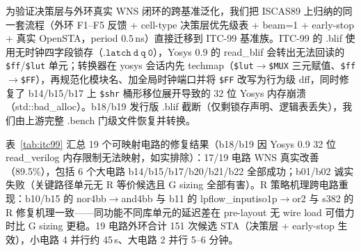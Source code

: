 \documentclass[journal]{IEEEtran}
\begin{document}
为验证决策层与外环真实 WNS 闭环的跨基准泛化，我们把 ISCAS89 上归纳的同一套流程（外环 F1--F5 反馈 + cell-type 决策层优先级表 + beam=1 + early-stop + 真实 OpenSTA，period $0.5\,$ns）直接迁移到 ITC-99 基准族。ITC-99 的 .blif 使用无时钟四字段锁存（$\mathtt{.latch\ d\ q\ 0}$），Yosys 0.9 的 read\_blif 会转出无法回读的 \texttt{\$ff}/\texttt{\$lut} 单元；转换器在 yosys 会话内先 techmap（\texttt{\$lut}$\rightarrow$\texttt{\$\textunderscore MUX\textunderscore} 三元赋值、\texttt{\$ff}$\rightarrow$\texttt{\$\textunderscore FF\textunderscore}），再规范化模块名、加全局时钟端口并将 \texttt{\$\textunderscore FF\textunderscore} 改写为行为级 dff，同时修复了 b14/b15/b17 上 \texttt{\$shr} 桶形移位展开导致的 32 位 Yosys 内存崩溃（std::bad\_alloc）。b18/b19 发行版 .blif 截断（仅剩锁存声明、逻辑表丢失），我们由上游完整 .bench 门级文件恢复并转换。

表~\ref{tab:itc99} 汇总 19 个可映射电路的修复结果（b18/b19 因 Yosys 0.9 32 位 read\_verilog 内存限制无法映射，如实排除）：17/19 电路 WNS 真实改善（89.5\%），包括 6 个大电路 b14/b15/b17/b20/b21/b22 全部成功；b01/b02 诚实失败（关键路径单元无 R 等价候选且 G sizing 全部有害）。R 策略机理跨电路重现：b10/b15 的 nor4bb$\rightarrow$and4bb 与 b11 的 lpflow\_inputiso1p$\rightarrow$or2 与 s382 的 R 修复机理一致——同功能不同库单元的延迟差在 pre-layout 无 wire load 可借力时比 G sizing 更稳。19 电路外环合计 151 次候选 STA（决策层 + early-stop 生效），小电路 4 并行约 45\,s、大电路 2 并行 5--6 分钟。
\end{document}
